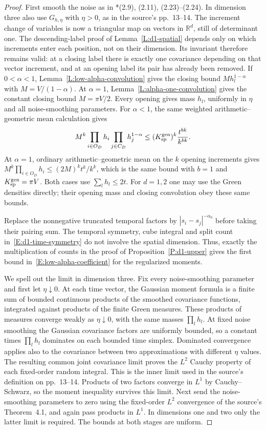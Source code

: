 \documentclass[12pt]{article}
\numberwithin{equation}{section}
\theoremstyle{definition}
\newcommand{\R}{\mathbb{R}}
\begin{document}
\begin{proof}
  First smooth the noise as in
  \cite{chen:author2026:time-dependency}*{(2.9), (2.11), (2.23)--(2.24)}.
  In dimension three also use $G_{h,\eta}$ with $\eta>0$, as in the
  source's pp.~13--14. The increment change of variables is now a
  triangular map on vectors in $\R^d$, still of determinant one.
  The descending-label proof of Lemma~\ref{L:d1-spatial} depends only
  on which increments enter each position, not on their dimension.
  Its invariant therefore remains valid: at a closing label there
  is exactly one covariance depending on that vector increment, and
  at an opening label its pair has already been removed.
  If $0<\alpha<1$, Lemma~\ref{L:low-alpha-convolution} gives the
  closing bound $Mh_l^{1-\alpha}$ with $M=V/(1-\alpha)$.
  At $\alpha=1$, Lemma~\ref{L:alpha-one-convolution} gives the
  constant closing bound $M=\pi V/2$. Every opening gives mass
  $h_l$, uniformly in $\eta$ and all noise-smoothing parameters.
  For $\alpha<1$, the same weighted arithmetic--geometric mean
  calculation gives
  \[
    M^k\prod_{i\in O_D}h_i\prod_{j\in C_D}h_j^{1-\alpha}
    \le (K_{\rm sp}^{\rm gen})^k\frac{t^{bk}}{k^{bk}}.
  \]
  At $\alpha=1$, ordinary arithmetic--geometric mean on the $k$
  opening increments gives
  $M^k\prod_{i\in O_D}h_i\le(2M)^kt^k/k^k$, which is the same
  bound with $b=1$ and $K_{\rm sp}^{\rm gen}=\pi V$.
  Both cases use $\sum_lh_l\le2t$. For $d=1,2$ one may use the
  Green densities directly; their opening mass and closing
  convolution obey these same bounds.

  Replace the nonnegative truncated temporal factors by
  $|s_i-s_j|^{-\alpha_0}$ before taking their pairing sum. The temporal
  symmetry, cube integral and split count
  in~\eqref{E:d1-time-symmetry} do not involve the spatial dimension.
  Thus, exactly the multiplication of counts in the proof of
  Proposition~\ref{P:d1-upper} gives the first bound
  in~\eqref{E:low-alpha-coefficient} for the regularized moments.

  We spell out the limit in dimension three. Fix every noise-smoothing
  parameter and first let $\eta\downarrow0$. At each time vector,
  the Gaussian moment formula is a finite sum of bounded continuous
  products of the smoothed covariance functions, integrated against
  products of the finite Green measures. These products of measures
  converge weakly as $\eta\downarrow0$, with the same masses
  $\prod_l h_l$. At fixed noise smoothing the Gaussian covariance
  factors are uniformly bounded, so a constant times $\prod_lh_l$
  dominates on each bounded time simplex. Dominated convergence
  applies also to the covariance between two approximations with
  different $\eta$ values. The resulting common joint covariance
  limit proves the $L^2$ Cauchy property of each fixed-order random
  integral. This is the inner limit used in the source's definition
  on pp.~13--14. Products of two factors converge in $L^1$ by
  Cauchy--Schwarz, so the moment inequality survives this limit.
  Next send the noise-smoothing parameters to zero using the
  fixed-order $L^2$ convergence of the source's Theorem~4.1, and again
  pass products in $L^1$. In dimensions one and two only the latter
  limit is required. The bounds at both stages are uniform.


\end{proof}
\end{document}
